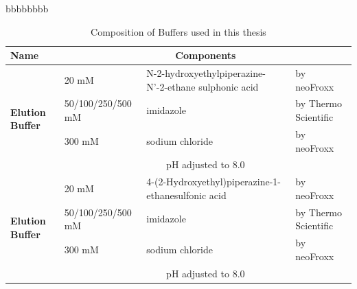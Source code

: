 \documentclass[
paper=a4,
12pt,
twoside=off,
bibliography=totoc,
listof=totoc,
appendixprefix,
headings=small]{scrbook}
\begin{document}
bbbbbbbb


\begin{longtable}[]{|m{1.5cm}|m{3.6cm}m{5cm}m{2.2cm}|}
    \caption{Composition of Buffers used in this thesis}
    \label{tab:buffers_used}
    \\

    \hline
        \textbf{Name} & \multicolumn{3}{c|}{\textbf{Components}} \\
    \hline
    \endfirsthead

    \multirow{4}{4em}{\textbf{Elution Buffer}} 
        & 20 mM & N-2-hydroxyethylpiperazine-N'-2-ethane sulphonic acid & by neoFroxx \\
        & 50/100/250/500 mM & imidazole & by Thermo Scientific \\
        & 300 mM & sodium chloride & by neoFroxx \\
        & \multicolumn{3}{c|}{pH adjusted to 8.0} \\    
    \hline
    
    \multirow{4}{4em}{\textbf{Elution Buffer}} 
        & 20 mM & 4-(2-Hydroxyethyl)piperazine-1-ethanesulfonic acid & by neoFroxx \\
        & 50/100/250/500 mM & imidazole & by Thermo Scientific \\
        & 300 mM & sodium chloride & by neoFroxx \\
        & \multicolumn{3}{c|}{pH adjusted to 8.0} \\    
    \hline
    
\end{longtable}
\end{document}

